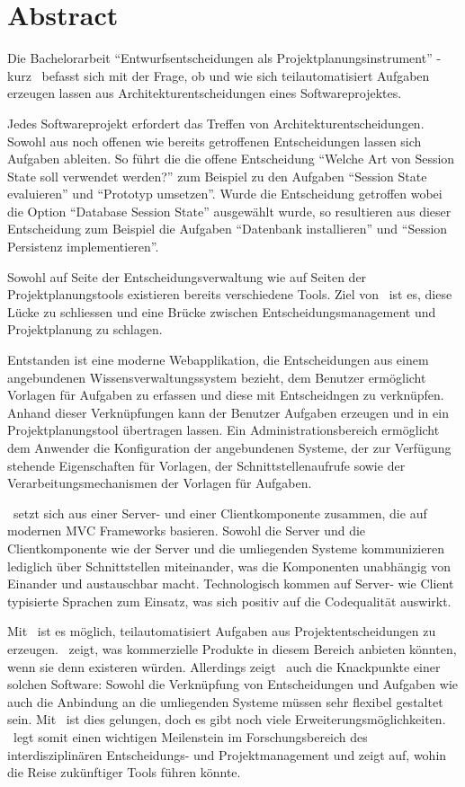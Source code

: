 \chapter{Abstract}

	Die Bachelorarbeit ``Entwurfsentscheidungen als Projektplanungsinstrument'' - kurz \eeppi\ befasst sich mit der Frage,
	ob und wie sich teilautomatisiert Aufgaben erzeugen lassen aus Architekturentscheidungen eines Softwareprojektes.

	Jedes Softwareprojekt erfordert das Treffen von Architekturentscheidungen.
	Sowohl aus noch offenen wie bereits getroffenen Entscheidungen lassen sich Aufgaben ableiten.
	So führt die die offene Entscheidung ``Welche Art von Session State soll verwendet werden?'' zum Beispiel zu den Aufgaben
	``Session State evaluieren'' und ``Prototyp umsetzen''.
	Wurde die Entscheidung getroffen wobei die Option ``Database Session State'' ausgewählt wurde,
	so resultieren aus dieser Entscheidung zum Beispiel die Aufgaben ``Datenbank installieren'' und
	``Session Persistenz implementieren''.

	Sowohl auf Seite der Entscheidungsverwaltung wie auf Seiten der Projektplanungstools existieren bereits verschiedene Tools.
	Ziel von \eeppi\ ist es, diese Lücke zu schliessen und eine Brücke zwischen Entscheidungsmanagement und Projektplanung zu schlagen.

	Entstanden ist eine moderne Webapplikation, die Entscheidungen aus einem angebundenen Wissensverwaltungssystem bezieht,
	dem Benutzer ermöglicht Vorlagen für Aufgaben zu erfassen und diese mit Entscheidngen zu verknüpfen.
	Anhand dieser Verknüpfungen kann der Benutzer Aufgaben erzeugen und in ein Projektplanungstool übertragen lassen.
	Ein Administrationsbereich ermöglicht dem Anwender die Konfiguration der angebundenen Systeme,
	der zur Verfügung stehende Eigenschaften für Vorlagen, der Schnittstellenaufrufe sowie der Verarbeitungsmechanismen der Vorlagen für Aufgaben.

	\eeppi\ setzt sich aus einer Server- und einer Clientkomponente zusammen, die auf modernen MVC Frameworks basieren.
	Sowohl die Server und die Clientkomponente wie der Server und die umliegenden Systeme kommunizieren lediglich über Schnittstellen miteinander,
	was die Komponenten unabhängig von Einander und austauschbar macht.
	Technologisch kommen auf Server- wie Client typisierte Sprachen zum Einsatz, was sich positiv auf die Codequalität auswirkt.

	Mit \eeppi\ ist es möglich, teilautomatisiert Aufgaben aus Projektentscheidungen zu erzeugen.
	\eeppi\ zeigt, was kommerzielle Produkte in diesem Bereich anbieten könnten, wenn sie denn existeren würden.
	Allerdings zeigt \eeppi\ auch die Knackpunkte einer solchen Software:
	Sowohl die Verknüpfung von Entscheidungen und Aufgaben wie auch die Anbindung an die umliegenden Systeme müssen sehr flexibel gestaltet sein.
	Mit \eeppi\ ist dies gelungen, doch es gibt noch viele Erweiterungsmöglichkeiten.
	\eeppi\ legt somit einen wichtigen Meilenstein im Forschungsbereich des interdisziplinären Entscheidungs- und Projektmanagement und
	zeigt auf, wohin die Reise zukünftiger Tools führen könnte.
